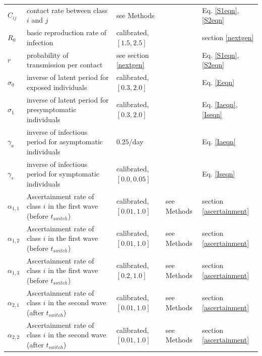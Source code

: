 \begin{table}[H]
\begin{tabular}{p{1cm} p{5cm} p{2cm} l l}
  $C_{ij}$    & contact rate between class $i$ and $j$ & see Methods & \cite{prem2020projecting}  & Eq. \ref{S1eqn},\ref{S2eqn} \\
  $R_0$ & basic reproduction rate of infection & calibrated, $[1.5,2.5]$ & \cite{hilton2020estimation,googlemobility, ontariocoviddata}  & section \ref{nextgen} \\
  $r$         & probability of transmission per contact   & see section \ref{nextgen} & \cite{diekmann2010construction} & Eq. \ref{S1eqn},\ref{S2eqn} \\
  $\sigma_0$    & inverse of latent period for exposed individuals & calibrated, $[0.3,2.0]$ & \cite{googlemobility, ontariocoviddata,nishiura2020serial,lauer2020incubation,tindale2020transmission} & Eq. \ref{Eeqn}\\
  $\sigma_1$    & inverse of latent period for presymptomatic individuals & calibrated, $[0.3,2.0]$ & \cite{googlemobility, ontariocoviddata,nishiura2020serial,lauer2020incubation,tindale2020transmission} & Eq. \ref{Iaeqn}, \ref{Iseqn}\\
  $\gamma_a$    & inverse of infectious period for asymptomatic individuals & $0.25$/day &  \cite{nishiura2020serial,lauer2020incubation,tindale2020transmission} & Eq. \ref{Iaeqn} \\
  $\gamma_s$    & inverse of infectious period for symptomatic individuals  & calibrated, $[0.0,0.05]$ & \cite{googlemobility, ontariocoviddata,nishiura2020serial,lauer2020incubation,tindale2020transmission} & Eq. \ref{Iseqn}\\
  $\alpha_{1,1}$ & Ascertainment rate of class $i$ in the first wave (before $t_{switch}$) & calibrated, $[0.01,1.0]$ & see Methods & section \ref{ascertainment} \\
  $\alpha_{1,2}$ & Ascertainment rate of class $i$  in the first wave (before $t_{switch}$) & calibrated, $[0.01,1.0]$ & see Methods& section \ref{ascertainment} \\
  $\alpha_{1,3}$ & Ascertainment rate of class $i$ in the first wave (before $t_{switch}$) & calibrated, $[0.2,1.0]$ & see Methods& section \ref{ascertainment} \\
  $\alpha_{2,1}$ & Ascertainment rate of class $i$  in the second wave (after $t_{switch}$)& calibrated, $[0.01,1.0]$ & see Methods& section \ref{ascertainment} \\
  $\alpha_{2,2}$ & Ascertainment rate of class $i$ in the second wave (after $t_{switch}$) & calibrated, $[0.01,1.0]$ & see Methods& section \ref{ascertainment} \\

\end{tabular}
\end{table}
